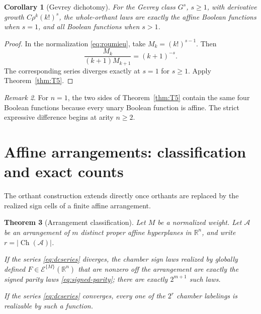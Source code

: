 \documentclass[11pt]{article}
\newtheorem{theorem}{Theorem}[section]
\newtheorem{corollary}[theorem]{Corollary}
\theoremstyle{definition}
\theoremstyle{remark}
\newtheorem{remark}[theorem]{Remark}
\newcommand{\R}{\mathbb{R}}
\newcommand{\Ch}{\operatorname{Ch}}
\newcommand{\cA}{\mathcal{A}}
\begin{document}
\begin{corollary}[Gevrey dichotomy]\label{cor:gevrey}
For the Gevrey class $G^s$, $s\ge1$, with derivative growth $C\rho^k(k!)^s$, the whole-orthant laws are exactly the affine Boolean functions when $s=1$, and all Boolean functions when $s>1$.
\end{corollary}

\begin{proof}
In the normalization \eqref{eq:roumieu}, take $M_k=(k!)^{s-1}$. Then
\[
 \frac{M_k}{(k+1)M_{k+1}}=(k+1)^{-s}.
\]
The corresponding series diverges exactly at $s=1$ for $s\ge1$. Apply Theorem~\ref{thm:T5}.
\end{proof}

\begin{remark}
For $n=1$, the two sides of Theorem~\ref{thm:T5} contain the same four Boolean functions because every unary Boolean function is affine. The strict expressive difference begins at arity $n\ge2$.
\end{remark}

\section{Affine arrangements: classification and exact counts}\label{sec:arrangements}

The orthant construction extends directly once orthants are replaced by the realized sign cells of a finite affine arrangement.

\begin{theorem}[Arrangement classification]\label{thm:T6}
Let $M$ be a normalized weight. Let $\cA$ be an arrangement of $m$ distinct proper affine hyperplanes in $\R^n$, and write $r=|\Ch(\cA)|$.

If the series \eqref{eq:dcseries} diverges, the chamber sign laws realized by globally defined $F\in\mathcal{E}^{\{M\}}(\R^n)$ that are nonzero off the arrangement are exactly the signed parity laws \eqref{eq:signed-parity}; there are exactly $2^{m+1}$ such laws.

If the series \eqref{eq:dcseries} converges, every one of the $2^r$ chamber labelings is realizable by such a function.
\end{theorem}
\end{document}
